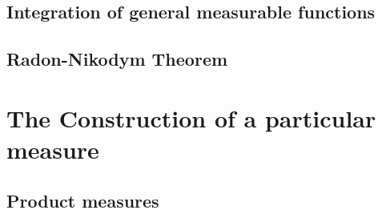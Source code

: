 \subsection{Integration of general measurable functions}
\subsection{Radon-Nikodym Theorem}


\setcounter{section}{19}
\section{The Construction of a particular measure}
\subsection{Product measures}

